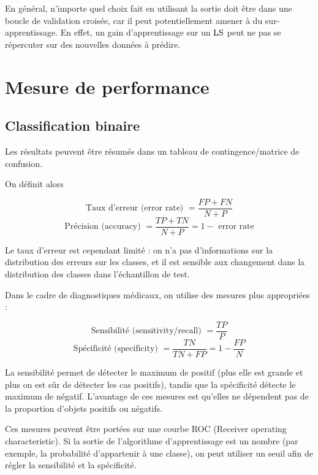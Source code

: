 	En général, n'importe quel choix fait en utilisant la sortie doit être dans une boucle de validation croisée, car il peut potentiellement amener à du sur-apprentissage. En effet, un gain d'apprentissage sur un $\text{LS}$ peut ne pas se répercuter sur des nouvelles données à prédire.
	
		
\section{Mesure de performance}

	\subsection{Classification binaire}
	
	Les résultats peuvent être résumés dans un tableau de contingence/matrice de confusion.
	
	
	On définit alors
	
	$$\text{Taux d'erreur (error rate) } = \frac{FP + FN}{N + P}$$
	$$\text{Précision (accuracy) } = \frac{TP + TN}{N + P} = 1 - \text{ error rate}$$
	
	Le taux d'erreur est cependant limité : on n'a pas d'informations sur la distribution des erreurs sur les classes, et il est sensible aux changement dans la distribution des classes dans l'échantillon de test.
	
	
	Dans le cadre de diagnostiques médicaux, on utilise des mesures plus appropriées :
	
	$$\text{Sensibilité (sensitivity/recall) } = \frac{TP}{P}$$
	$$\text{Spécificité (specificity) } = \frac{TN}{TN + FP} = 1 - \frac{FP}{N}$$
	
	La sensibilité permet de détecter le maximum de positif (plus elle est grande et plus on est sûr de détecter les cas positifs), tandis que la spécificité détecte le maximum de négatif. L'avantage de ces mesures est qu'elles ne dépendent pas de la proportion d'objets positifs ou négatifs.
	
	Ces mesures peuvent être portées sur une courbe ROC (Receiver operating characteristic). Si la sortie de l'algorithme d'apprentissage est un nombre (par exemple, la probabilité d'appartenir à une classe), on peut utiliser un seuil afin de régler la sensibilité et la spécificité.
	
	
